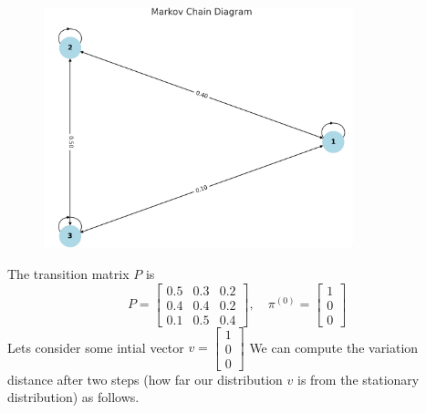 \documentclass[a4paper]{article}
\begin{document}
\begin{figure}[h]
  \centering
  \includegraphics[width=0.8\textwidth]{assets/3_state_markov_chain.png}
  \label{fig:3_state_markov_chain}
\end{figure}
The transition matrix $P$ is \[
P = \begin{bmatrix} 
0.5 & 0.3 & 0.2 \\
0.4 & 0.4 & 0.2 \\
0.1 & 0.5 & 0.4 
\end{bmatrix}, \quad \pi^{(0)} = \begin{bmatrix} 1 \\ 0 \\ 0 \end{bmatrix}
\] Lets consider some intial vector $v= \begin{bmatrix} 1 \\ 0 \\ 0 \end{bmatrix}$
We can compute the variation distance after two steps (how far our distribution $v$ is from the stationary distribution) as follows.
\end{document}
